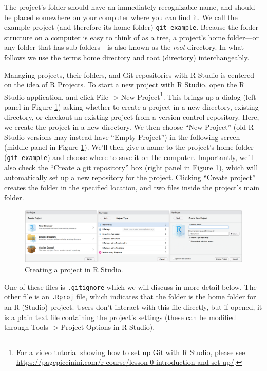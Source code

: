 \documentclass[
  american,
  ,doc,floatsintext]{apa6}
\begin{document}
The project's folder should have an immediately recognizable name, and should be placed somewhere on your computer where you can find it. We call the example project (and therefore its home folder) \texttt{git-example}. Because the folder structure on a computer is easy to think of as a tree, a project's home folder---or any folder that has sub-folders---is also known as the \emph{root} directory. In what follows we use the terms home directory and root (directory) interchangeably.

Managing projects, their folders, and Git repositories with R Studio is centered on the idea of R Projects. To start a new project with R Studio, open the R Studio application, and click File -\textgreater{} New Project\footnote{For a video tutorial showing how to set up Git with R Studio, please see \url{https://pagepiccinini.com/r-course/lesson-0-introduction-and-set-up/}.}. This brings up a dialog (left panel in Figure \ref{fig:rstudio-project-1}) asking whether to create a project in a new directory, existing directory, or checkout an existing project from a version control repository. Here, we create the project in a new directory. We then choose ``New Project'' (old R Studio versions may instead have ``Empty Project'') in the following screen (middle panel in Figure \ref{fig:rstudio-project-1}). We'll then give a name to the project's home folder (\texttt{git-example}) and choose where to save it on the computer. Importantly, we'll also check the ``Create a git repository'' box (right panel in Figure \ref{fig:rstudio-project-1}), which will automatically set up a new repository for the project. Clicking ``Create project'' creates the folder in the specified location, and two files inside the project's main folder.

\begin{figure}

{\centering \includegraphics[width=6in]{images/rstudio-project-1} 

}

\caption{Creating a project in R Studio.}\label{fig:rstudio-project-1}
\end{figure}

One of these files is \texttt{.gitignore} which we will discuss in more detail below. The other file is an \texttt{.Rproj} file, which indicates that the folder is the home folder for an R (Studio) project. Users don't interact with this file directly, but if opened, it is a plain text file containing the project's settings (these can be modified through Tools -\textgreater{} Project Options in R Studio).
\end{document}
